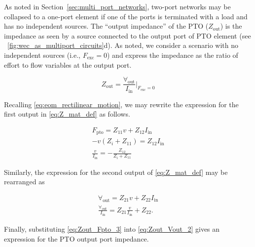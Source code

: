 \documentclass[lettersize,journal]{IEEEtran}
\begin{document}
As noted in Section~\ref{sec:multi_port_networks}, two-port networks may be collapsed to a one-port element if one of the ports is terminated with a load and has no independent sources.
The ``output impedance'' of the PTO ($Z_{\textrm{out}}$) is the impedance as seen by a source connected to the output port of PTO element (see \figurename~\ref{fig:wec_as_multiport_circuits}d).
As noted, we consider a scenario with no independent sources (i.e., $F_{\textrm{exc}} = 0$) and express the impedance as the ratio of effort to flow variables at the output port. 

\begin{equation}
        Z_{\textrm{out}} = \frac{\forall_{\textrm{out}}}{I_{\textrm{in}}} \bigg\vert_{F_{\textrm{exc}}=0}
        \label{eq:Zout_1}
\end{equation}

\noindent{}Recalling \eqref{eq:eom_rectilinear_motion}, we may rewrite the expression for the first output in \eqref{eq:Z_mat_def} as follows.

\begin{subequations}
        \begin{align}
                F_{\textrm{pto}} = Z_{11} v + Z_{12} I_{\textrm{in}} \label{eq:Zout_Fpto_1} \\[0.5em]
                -v (Z_i + Z_{11}) = Z_{12} I_{\textrm{in}} \label{eq:Zout_Fpto_2} \\[0.5em]
                \frac{v}{I_{\textrm{in}}} = -\frac{Z_{12}}{Z_i + Z_{11}} \label{eq:Zout_Fpto_3}
        \end{align}
        \label{eq:Zout_Fpto}
\end{subequations}

\noindent{}Similarly, the expression for the second output of \eqref{eq:Z_mat_def} may be rearranged as

\clearpage

\begin{subequations}
        \begin{align}
                \forall_{\textrm{out}} = Z_{21} v + Z_{22} I_{\textrm{in}} \label{eq:Zout_Vout_1} \\[0.5em]
                \frac{\forall_{\textrm{out}}}{I_{\textrm{in}}} = Z_{21} \frac{v}{I_{\textrm{in}}} + Z_{22} . \label{eq:Zout_Vout_2}
        \end{align} 
        \label{eq:Zout_Vout}
\end{subequations}

\noindent{}Finally, substituting \eqref{eq:Zout_Fpto_3} into \eqref{eq:Zout_Vout_2} gives an expression for the PTO output port impedance.
\end{document}
